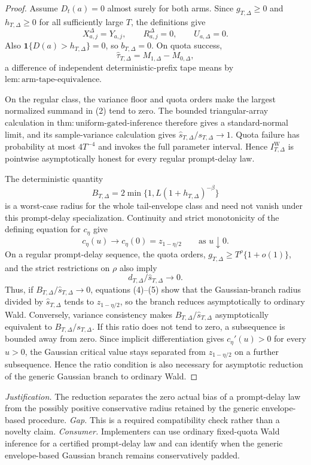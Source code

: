 \documentclass{article}
\begin{document}
\begin{proof}
Assume \(D_t(a)=0\) almost surely for both arms.  Since \(g_{T,\Delta}\geq0\) and \(h_{T,\Delta}\geq0\) for all sufficiently large \(T\), the definitions give
\[
 X_{a,j}^{\Delta}=Y_{a,j},\qquad R_{a,j}^{\Delta}=0,
 \qquad U_{a,\Delta}=0. \tag{1}
\]
Also \(\mathbf 1\{D(a)>h_{T,\Delta}\}=0\), so \(b_{T,\Delta}=0\).  On quota success,
\[
 \widehat\tau_{T,\Delta}=M_{1,\Delta}-M_{0,\Delta}, \tag{2}
\]
a difference of independent deterministic-prefix tape means by \(\mathrm{lem:arm\text{-}tape\text{-}equivalence}\).

On the regular class, the variance floor and quota orders make the largest normalized summand in (2) tend to zero.  The bounded triangular-array calculation in \(\mathrm{thm:uniform\text{-}gated\text{-}inference}\) therefore gives a standard-normal limit, and its sample-variance calculation gives \(\widehat s_{T,\Delta}/s_{T,\Delta}\to1\).  Quota failure has probability at most \(4T^{-4}\) and invokes the full parameter interval.  Hence \(I_{T,\Delta}^{\mathrm W}\) is pointwise asymptotically honest for every regular prompt-delay law.

The deterministic quantity
\[
 B_{T,\Delta}=2\min\{1,L(1+h_{T,\Delta})^{-\beta}\} \tag{3}
\]
is a worst-case radius for the whole tail-envelope class and need not vanish under this prompt-delay specialization.  Continuity and strict monotonicity of the defining equation for \(c_\eta\) give
\[
 c_\eta(u)\longrightarrow c_\eta(0)=z_{1-\eta/2}
 \qquad\text{as }u\downarrow0. \tag{4}
\]
On a regular prompt-delay sequence, the quota orders, \(g_{T,\Delta}\geq T^\rho\{1+o(1)\}\), and the strict restrictions on \(\rho\) also imply
\[
 d_{T,\Delta}/\widehat s_{T,\Delta}\longrightarrow0. \tag{5}
\]
Thus, if \(B_{T,\Delta}/\widehat s_{T,\Delta}\to0\), equations (4)--(5) show that the Gaussian-branch radius divided by \(\widehat s_{T,\Delta}\) tends to \(z_{1-\eta/2}\), so the branch reduces asymptotically to ordinary Wald.  Conversely, variance consistency makes \(B_{T,\Delta}/\widehat s_{T,\Delta}\) asymptotically equivalent to \(B_{T,\Delta}/s_{T,\Delta}\).  If this ratio does not tend to zero, a subsequence is bounded away from zero.  Since implicit differentiation gives \(c_\eta'(u)>0\) for every \(u>0\), the Gaussian critical value stays separated from \(z_{1-\eta/2}\) on a further subsequence.  Hence the ratio condition is also necessary for asymptotic reduction of the generic Gaussian branch to ordinary Wald.
\end{proof}
\par\smallskip\noindent \textit{Justification.} The reduction separates the zero actual bias of a prompt-delay law from the possibly positive conservative radius retained by the generic envelope-based procedure. \textit{Gap.} This is a required compatibility check rather than a novelty claim. \textit{Consumer.} Implementers can use ordinary fixed-quota Wald inference for a certified prompt-delay law and can identify when the generic envelope-based Gaussian branch remains conservatively padded.
\end{document}
